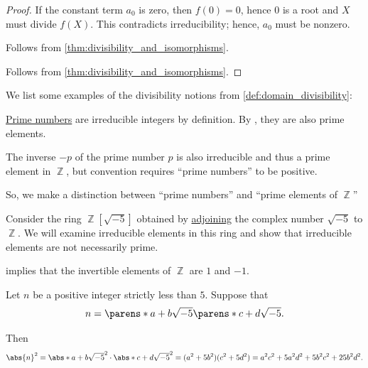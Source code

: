 \begin{proof}
  If the constant term \( a_0 \) is zero, then \( f(0) = 0 \), hence \( 0 \) is a root and \( X \) must divide \( f(X) \). This contradicts irreducibility; hence, \( a_0 \) must be nonzero.

   Follows from \cref{thm:divisibility_and_isomorphisms}.

   Follows from \cref{thm:divisibility_and_isomorphisms}.
\end{proof}

\begin{example}\label{ex:def:domain_divisibility}
  We list some examples of the divisibility notions from \cref{def:domain_divisibility}:
  \begin{thmenum}
     \hyperref[def:prime_number]{Prime numbers} are irreducible integers by definition. By , they are also prime elements.

    The inverse \( -p \) of the prime number \( p \) is also irreducible and thus a prime element in \( \BbbZ \), but convention requires \enquote{prime numbers} to be positive.

    So, we make a distinction between \enquote{prime numbers} and \enquote{prime elements of \( \BbbZ \)}

     Consider the ring \( \BbbZ[\sqrt{-5}] \) obtained by \hyperref[def:semiring_adjunction]{adjoining} the complex number \( \sqrt{-5} \) to \( \BbbZ \). We will examine irreducible elements in this ring and show that irreducible elements are not necessarily prime.

     implies that the invertible elements of \( \BbbZ \) are \( 1 \) and \( -1 \).

    Let \( n \) be a positive integer strictly less than \( 5 \). Suppose that
    \begin{equation}\label{eq:ex:def:domain_divisibility/irreducible_not_prime/decomposition}
      n = \parens*{ a + b \sqrt{-5} }\parens*{ c + d \sqrt{-5}}.
    \end{equation}

    Then
    \begin{equation}\label{eq:ex:def:domain_divisibility/irreducible_not_prime/abs}
      \abs{n}^2
      =
      \abs*{a + b \sqrt{-5}}^2 \cdot \abs*{c + d \sqrt{-5}}^2
      =
      (a^2 + 5b^2) (c^2 + 5d^2)
      =
      a^2 c^2 + 5a^2 d^2 + 5b^2 c^2 + 25 b^2 d^2.
    \end{equation}


\end{thmenum}
\end{example}
